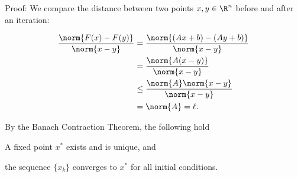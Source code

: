 \documentclass{homework}
\begin{document}
Proof: We compare the distance between two points $x,y \in \R^n$ before
and after an iteration:

\begin{align}
    \frac{\norm{F(x) - F(y)}}{\norm{x - y}} &=
            \frac{\norm{(Ax + b) - (Ay + b)}}{\norm{x - y}} \\
        &= \frac{\norm{A(x-y)}}{\norm{x - y}} \\
        &\leq \frac{\norm{A}\norm{x-y}}{\norm{x - y}} \\
        &= \norm{A} = \ell.
\end{align}

By the Banach Contraction Theorem, the following hold
\begin{letterenum}
    \item A fixed point $x^*$ exists and is unique, and
    \item the sequence $\{x_k\}$ converges to $x^*$ for all initial conditions.
\end{letterenum}
\end{document}
